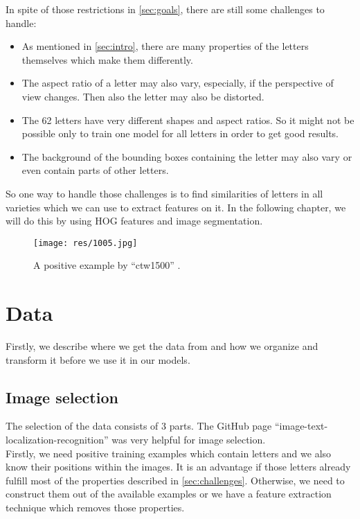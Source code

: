 \documentclass[conference]{IEEEtran}
\begin{document}
In spite of those restrictions in \ref{sec:goals}, there are still some challenges to handle:
\begin{itemize}
\item As mentioned in \ref{sec:intro}, there are many properties of the letters themselves which make them differently.
\item The aspect ratio of a letter may also vary, especially, if the perspective of view changes. Then also the letter may also be distorted.
\item The 62 letters have very different shapes and aspect ratios. So it might not be possible only to train one model for all letters in order to get good results.
\item The background of the bounding boxes containing the letter may also vary or even contain parts of other letters.
\end{itemize}
So one way to handle those challenges is to find similarities of letters in all varieties which we can use to extract features on it. In the following chapter, we will do this by using HOG features and image segmentation.

\begin{figure}[htbp]
\centerline{\texttt{[image: res/1005.jpg]}}
\caption{A positive example by ``ctw1500'' \cite{bib:ctw}.}
\label{fig:pos}
\end{figure}

\section{Data}

\noindent
Firstly, we describe where we get the data from and how we organize and transform it before we use it in our models.

\subsection{Image selection}\label{sec:img-sel}

The selection of the data consists of 3 parts. The GitHub page ``image-text-localization-recognition'' \cite{bib:github} was very helpful for image selection. \\[-5pt]

Firstly, we need positive training examples which contain letters and we also know their positions within the images. It is an advantage if those letters already fulfill most of the properties described in \ref{sec:challenges}. Otherwise, we need to construct them out of the available examples or we have a feature extraction technique which removes those properties.
\end{document}
